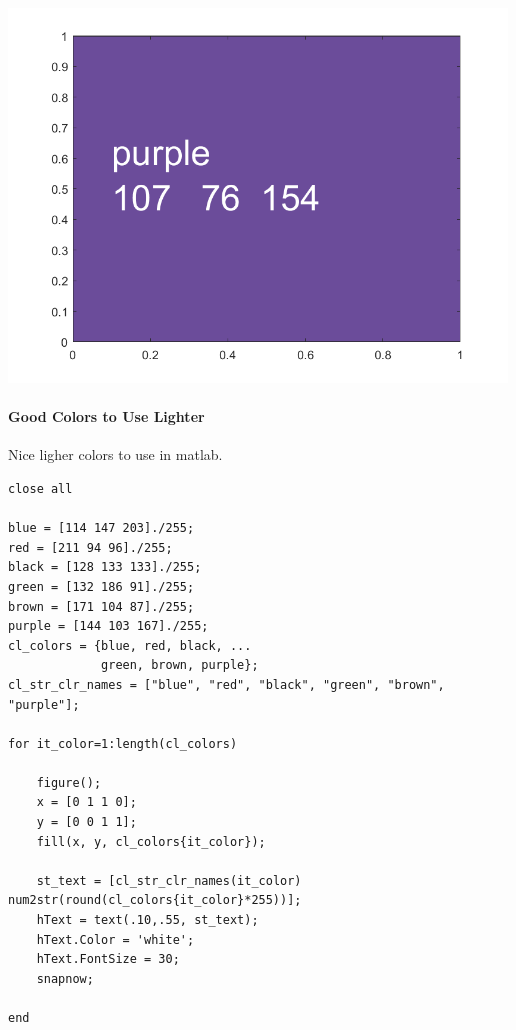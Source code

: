 \documentclass[
]{book}
\begin{document}
\includegraphics[width=5.20833in,height=\textheight]{img/fs_color_images/figure_5.png}

\hypertarget{good-colors-to-use-lighter}{%
\paragraph{Good Colors to Use Lighter}\label{good-colors-to-use-lighter}}

Nice ligher colors to use in matlab.

\begin{verbatim}
close all

blue = [114 147 203]./255;
red = [211 94 96]./255;
black = [128 133 133]./255;
green = [132 186 91]./255;
brown = [171 104 87]./255;
purple = [144 103 167]./255;
cl_colors = {blue, red, black, ...
             green, brown, purple};
cl_str_clr_names = ["blue", "red", "black", "green", "brown", "purple"];

for it_color=1:length(cl_colors)
    
    figure();
    x = [0 1 1 0];
    y = [0 0 1 1];
    fill(x, y, cl_colors{it_color});
    
    st_text = [cl_str_clr_names(it_color) num2str(round(cl_colors{it_color}*255))];
    hText = text(.10,.55, st_text);
    hText.Color = 'white';
    hText.FontSize = 30; 
    snapnow;
    
end
\end{verbatim}
\end{document}
